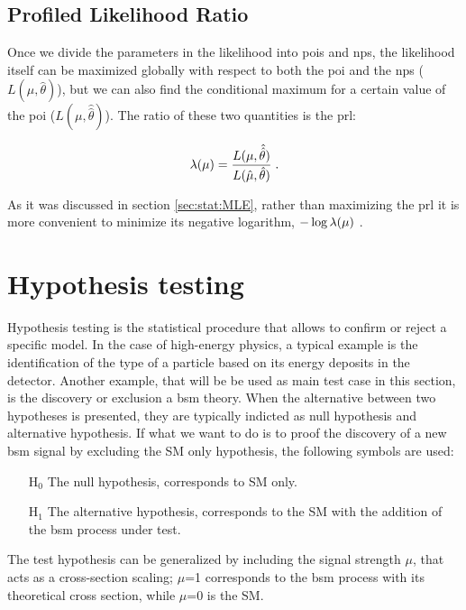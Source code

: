 \subsection{Profiled Likelihood Ratio}

Once we divide the parameters in the likelihood into \glspl{poi} and \glspl{np}, the likelihood itself can be maximized globally with respect to both the \gls{poi} and the \glspl{np} ($L(\hat{\mu}, \hat{\theta})$), but we can also find the conditional maximum for a certain value of the \gls{poi} ($L(\mu, \hat{\hat{\theta}})$). The ratio of these two quantities is the \gls{prl}:

\begin{equation}
\label{eq:stat:prl}
\lambda(\mu) = \frac{ L(\mu, \hat{\hat{\theta}}) } {L(\hat{\mu}, \hat{\theta}) } \;.
\end{equation}

\noindent As it was discussed in section \ref{sec:stat:MLE}, rather than maximizing the \gls{prl} it is more convenient to minimize its negative logarithm, $- \log{\lambda(\mu)} \ $.


\section{Hypothesis testing}
\label{sec:stat:ht}

Hypothesis testing is the statistical procedure that allows to confirm or reject a specific model. In the case of high-energy physics, a typical example is the identification of the type of a particle based on its energy deposits in the detector. Another example, that will be be used as main test case in this section, is the discovery or exclusion a \gls{bsm} theory. When the alternative between two hypotheses is presented, they are typically indicted as null hypothesis and alternative hypothesis. If what we want to do is to proof the discovery of a new \gls{bsm} signal by excluding the SM only hypothesis, the following symbols are used:

\begin{itemize}
\item[H$_0$] The null hypothesis, corresponds to SM only.
\item[H$_1$] The alternative hypothesis, corresponds to the SM with the addition of the \gls{bsm} process under test.
\end{itemize}

\noindent The test hypothesis can be generalized by including the signal strength $\mu$, that acts as a cross-section scaling; $\mu$=1 corresponds to the \gls{bsm} process with its theoretical cross section, while $\mu$=0 is the SM.

